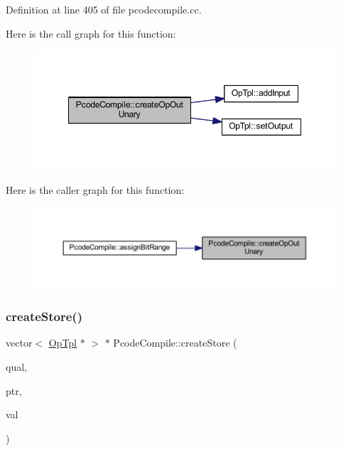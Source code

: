 Definition at line 405 of file pcodecompile.\+cc.

Here is the call graph for this function\+:
\nopagebreak
\begin{figure}[H]
\begin{center}
\leavevmode
\includegraphics[width=348pt]{class_pcode_compile_a65b6f2be619a063a46c3727a2de1215d_cgraph}
\end{center}
\end{figure}
Here is the caller graph for this function\+:
\nopagebreak
\begin{figure}[H]
\begin{center}
\leavevmode
\includegraphics[width=350pt]{class_pcode_compile_a65b6f2be619a063a46c3727a2de1215d_icgraph}
\end{center}
\end{figure}
\mbox{\label{class_pcode_compile_a4a695c299bec6d0142fa28c988dadb5f}} 
\subsubsection{\texorpdfstring{createStore()}{createStore()}}
{\footnotesize\ttfamily vector$<$ \mbox{\hyperlink{class_op_tpl}{Op\+Tpl}} $\ast$ $>$ $\ast$ Pcode\+Compile\+::create\+Store (\begin{DoxyParamCaption}\item[{\mbox{\hyperlink{struct_star_quality}{Star\+Quality}} $\ast$}]{qual,  }\item[{\mbox{\hyperlink{class_expr_tree}{Expr\+Tree}} $\ast$}]{ptr,  }\item[{\mbox{\hyperlink{class_expr_tree}{Expr\+Tree}} $\ast$}]{val }\end{DoxyParamCaption})}



